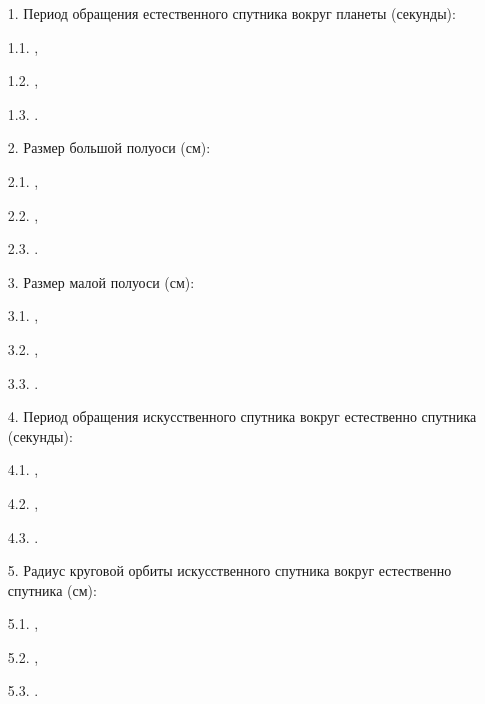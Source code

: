\begin{enumerate}
    \item[1.] Период обращения естественного спутника вокруг планеты (секунды): 
    \item[1.1.]	\underline{\hspace{5cm}},
    \item[1.2.]	\underline{\hspace{5cm}},
    \item[1.3.]	\underline{\hspace{5cm}}.
    \item[2.] Размер большой полуоси (см):
    \item[2.1.]	\underline{\hspace{5cm}},
    \item[2.2.]	\underline{\hspace{5cm}},
    \item[2.3.]	\underline{\hspace{5cm}}.
    \item[3.] Размер малой полуоси (см):
    \item[3.1.]	\underline{\hspace{5cm}},
    \item[3.2.]	\underline{\hspace{5cm}},
    \item[3.3.]	\underline{\hspace{5cm}}.
    \item[4.] Период обращения искусственного спутника вокруг естественно спутника (секунды): 
    \item[4.1.]	\underline{\hspace{5cm}},
    \item[4.2.]	\underline{\hspace{5cm}},
    \item[4.3.]	\underline{\hspace{5cm}}.
    \item[5.] Радиус круговой орбиты искусственного спутника вокруг естественно спутника (см):
    \item[5.1.]	\underline{\hspace{5cm}},
    \item[5.2.]	\underline{\hspace{5cm}},
    \item[5.3.]	\underline{\hspace{5cm}}.
\end{enumerate} 
